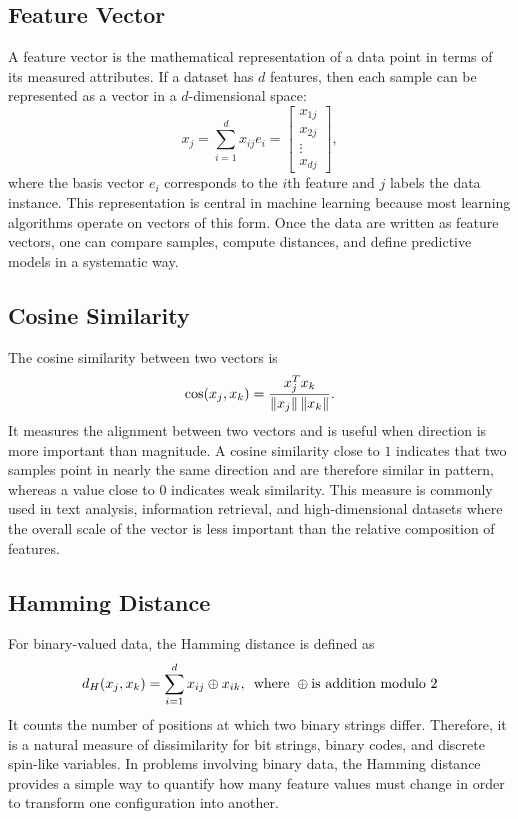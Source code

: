 \documentclass[english,12pt,a4paper]{report}
\begin{document}
	\subsection{Feature Vector}
	\hspace{1.15em}A feature vector is the mathematical representation of a data point in terms of its measured attributes. If a dataset has $d$ features, then each sample can be represented as a vector in a $d$-dimensional space:
	\[
	x_j=\sum_{i=1}^{d}x_{ij}e_i=
	\begin{bmatrix}
		x_{1j}\\x_{2j}\\\vdots\\x_{dj}
	\end{bmatrix},
	\]
	where the basis vector $e_i$ corresponds to the $i$th feature and $j$ labels the data instance. This representation is central in machine learning because most learning algorithms operate on vectors of this form. Once the data are written as feature vectors, one can compare samples, compute distances, and define predictive models in a systematic way.
	
	\subsection{Cosine Similarity}
	\hspace{1.15em}The cosine similarity between two vectors is
	\[
	\cos(x_j,x_k)=\frac{x_j^Tx_k}{\norm{x_j}\,\norm{x_k}}.
	\]
	It measures the alignment between two vectors and is useful when direction is more important than magnitude. A cosine similarity close to $1$ indicates that two samples point in nearly the same direction and are therefore similar in pattern, whereas a value close to $0$ indicates weak similarity. This measure is commonly used in text analysis, information retrieval, and high-dimensional datasets where the overall scale of the vector is less important than the relative composition of features.
	
	\subsection{Hamming Distance}
	\hspace{1.15em}For binary-valued data, the Hamming distance is defined as
	\[
	d_H(x_j,x_k)=\sum_{i=1}^{d}x_{ij}\oplus x_{ik} , \hspace{0.5em} \text{where }\oplus \text{is addition modulo 2}
	\]
	It counts the number of positions at which two binary strings differ. Therefore, it is a natural measure of dissimilarity for bit strings, binary codes, and discrete spin-like variables. In problems involving binary data, the Hamming distance provides a simple way to quantify how many feature values must change in order to transform one configuration into another.
	
\end{document}
